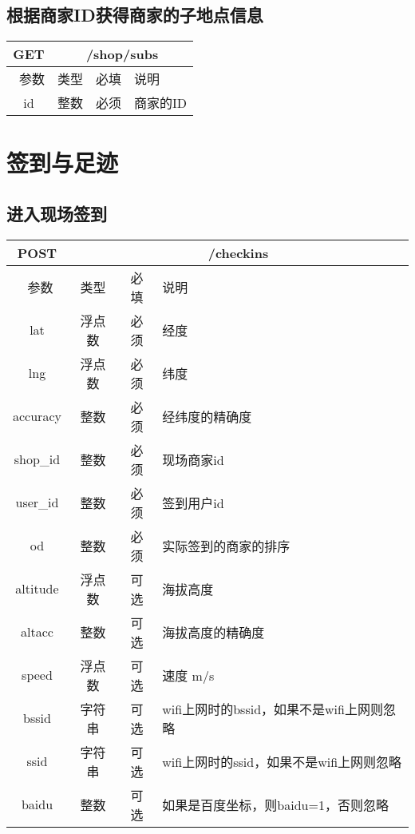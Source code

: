 \documentclass[cs4size]{ctexartutf8}
\begin{document}
\subsection{根据商家ID获得商家的子地点信息}

\begin{table}[H]
   \begin{center}
\begin{tabular}{|c|c|c|p{12cm}|}
\hline
GET & \multicolumn{3}{|c|}{/shop/subs} \\
\hline\hline
 \  参数  & 类型 & 必填 &  说明  \\
\hline
 id  & 整数 & 必须 & 商家的ID\\
\hline
\end{tabular}
   \end{center}
\end{table}



\section{签到与足迹}

\subsection{进入现场签到}

\begin{table}[H]
   \begin{center}
\begin{tabular}{|c|c|c|p{12cm}|}
\hline
POST & \multicolumn{3}{|c|}{/checkins} \\
\hline\hline
 \  参数  & 类型 & 必填 &  说明  \\
\hline
 lat  & 浮点数 & 必须 & 经度\\
\hline
 lng  &  浮点数 & 必须 & 纬度\\ 
\hline
 accuracy  & 整数 & 必须 & 经纬度的精确度\\ 
\hline
 shop\_id  & 整数 & 必须 &  现场商家id\\ 
\hline
 user\_id  & 整数 & 必须 &  签到用户id\\ 
\hline
 od  & 整数 & 必须 &  实际签到的商家的排序\\  
\hline
 altitude  &  浮点数 & 可选 & 海拔高度\\ 
\hline
 altacc  & 整数 & 可选 & 海拔高度的精确度\\  
\hline
 speed  & 浮点数 & 可选 & 速度 m/s\\   
\hline
 bssid  & 字符串 & 可选 & wifi上网时的bssid，如果不是wifi上网则忽略\\  
\hline
 ssid  & 字符串 & 可选 & wifi上网时的ssid，如果不是wifi上网则忽略\\  
\hline
 baidu  & 整数 & 可选 & 如果是百度坐标，则baidu=1，否则忽略\\  
\hline
\end{tabular}
   \end{center}
\end{table}
\end{document}

